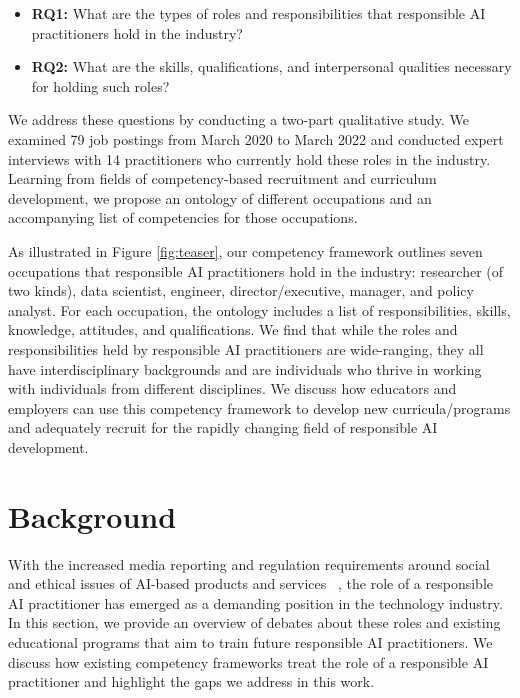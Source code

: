 \documentclass[sigconf]{acmart}
\begin{document}
\begin{itemize}
    \item \textbf{RQ1:} What are the types of roles and responsibilities that responsible AI practitioners hold in the industry? 
    \item \textbf{RQ2:} What are the skills, qualifications, and interpersonal qualities necessary for holding such roles? 
\end{itemize}


We address these questions by conducting a two-part qualitative study. We examined 79 job postings from March 2020 to March 2022 and conducted expert interviews with 14 practitioners who currently hold these roles in the industry. Learning from fields of competency-based recruitment and curriculum development, we propose an ontology of different occupations and an accompanying list of competencies for those occupations. 

As illustrated in Figure \ref{fig:teaser}, our competency framework outlines seven occupations that responsible AI practitioners hold in the industry: researcher (of two kinds), data scientist, engineer, director/executive, manager, and policy analyst. For each occupation, the ontology includes a list of responsibilities, skills, knowledge, attitudes, and qualifications. We find that while the roles and responsibilities held by responsible AI practitioners are wide-ranging, they all have interdisciplinary backgrounds and are individuals who thrive in working with individuals from different disciplines. We discuss how educators and employers can use this competency framework to develop new curricula/programs and adequately recruit for the rapidly changing field of responsible AI development.   

\section{Background}

 With the increased media reporting and regulation requirements around social and ethical issues of AI-based products and services ~\cite{Stuurman2022-kb,Mokander2022-ae,aida-euai,Shelby2022-oi,Rismani2023-im,Weidinger2022-ni}, the role of a responsible AI practitioner has emerged as a demanding position in the technology industry. In this section, we provide an overview of debates about these roles and existing educational programs that aim to train future responsible AI practitioners. We discuss how existing competency frameworks treat the role of a responsible AI practitioner and highlight the gaps we address in this work. 
\end{document}
